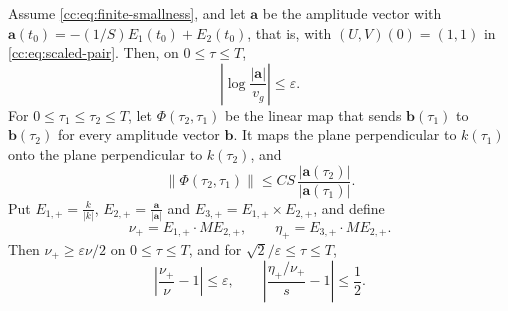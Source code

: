 \begin{lemma}\label{cc:lem:finite-comparison}
Assume \eqref{cc:eq:finite-smallness}, and let $\mathbf a$ be the
amplitude vector with
$\mathbf a(t_0)=-(1/S)E_1(t_0)+E_2(t_0)$, that is, with
$(U,V)(0)=(1,1)$ in \eqref{cc:eq:scaled-pair}. Then, on
$0\le\tau\le T$,
\begin{equation}\label{cc:eq:norm-rate-error}
 \left|\log\frac{|\mathbf a|}{v_g}\right|\le\varepsilon.
\end{equation}
For $0\le\tau_1\le\tau_2\le T$, let $\Phi(\tau_2,\tau_1)$ be the linear
map that sends $\mathbf b(\tau_1)$ to $\mathbf b(\tau_2)$ for every
amplitude vector $\mathbf b$. It maps the plane perpendicular to
$k(\tau_1)$ onto the plane perpendicular to $k(\tau_2)$, and
\[
 \|\Phi(\tau_2,\tau_1)\|\le CS\,\frac{|\mathbf a(\tau_2)|}{|\mathbf a(\tau_1)|}.
\]
Put $E_{1,+}=\frac{k}{|k|}$, $E_{2,+}=\frac{\mathbf a}{|\mathbf a|}$ and
$E_{3,+}=E_{1,+}\times E_{2,+}$, and define
\[
 \nu_+=E_{1,+}\cdot ME_{2,+},\qquad \eta_+=E_{3,+}\cdot ME_{2,+}.
\]
Then $\nu_+\ge\varepsilon\nu/2$ on $0\le\tau\le T$, and for
$\sqrt2/\varepsilon\le\tau\le T$,
\begin{equation}\label{cc:eq:actual-ratio}
 \left|\frac{\nu_+}{\nu}-1\right|\le\varepsilon,\qquad
 \left|\frac{\eta_+/\nu_+}{s}-1\right|\le\frac12.
\end{equation}
\end{lemma}
